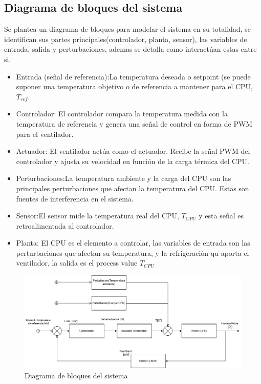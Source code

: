 \documentclass[12pt]{article}
\begin{document}
	 \subsection{Diagrama de bloques del sistema}
	 Se plantea un diagrama de bloques para modelar el sistema en su totalidad, se identifican sus partes principales(controlador, planta, sensor), las variables de entrada, salida y perturbaciones, ademas se detalla como interactúan estas entre si.
	 \begin{itemize}
	 	\item Entrada (señal de referencia):La temperatura deseada o setpoint (se puede suponer una temperatura objetivo o de referencia a mantener para el CPU, $T_{ref}$.
	 	\item Controlador: El controlador compara la temperatura medida con la temperatura de referencia y genera una señal de control en forma de PWM para el ventilador.
	 	\item Actuador: El ventilador actúa como el actuador. Recibe la señal PWM del controlador y ajusta su velocidad en función de la carga térmica del CPU.
	 	\item Perturbaciones:La temperatura ambiente y la carga del CPU son las principales perturbaciones que afectan la temperatura del CPU. Estas son fuentes de interferencia en el sistema.
	 	\item Sensor:El sensor mide la temperatura real del CPU, $T_{CPU}$ y esta señal es retroalimentada al controlador.
	 	\item Planta: El CPU es el elemento a controlar, las variables de entrada son las perturbaciones que afectan su temperatura, y la refrigeración qu aporta el ventilador, la salida es el process value $T_{CPU}$
	 \end{itemize}
	 
	\begin{figure}
		\includegraphics[width=1\linewidth]{Imagenes/diagrama_de_flujo}
		\caption[Diagrama de bloques del sistema]{Diagrama de bloques del sistema}
		\label{fig:diagramadeflujo}
	\end{figure}
	
\end{document}

